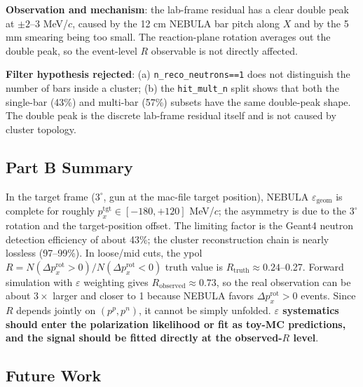 \documentclass[a4paper,11pt]{article}
\begin{document}
\textbf{Observation and mechanism}: the lab-frame residual has a clear double
peak at $\pm 2$--$3$ MeV/$c$, caused by the 12 cm NEBULA bar pitch along $X$
and by the 5 mm smearing being too small. The reaction-plane rotation averages
out the double peak, so the event-level $R$ observable is not directly affected.

\textbf{Filter hypothesis rejected}: (a) \texttt{n\_reco\_neutrons==1} does not
distinguish the number of bars inside a cluster; (b) the \texttt{hit\_mult\_n}
split shows that both the single-bar (43\%) and multi-bar (57\%) subsets have
the same double-peak shape. The double peak is the discrete lab-frame residual
itself and is not caused by cluster topology.

\subsection{Part B Summary}

In the target frame ($3^\circ$, gun at the mac-file target position),
NEBULA $\varepsilon_\mathrm{geom}$ is complete for roughly
$p_x^\mathrm{tgt}\in[-180,+120]$ MeV/$c$; the asymmetry is due to the
$3^\circ$ rotation and the target-position offset. The limiting factor is the
Geant4 neutron detection efficiency of about 43\%; the cluster reconstruction
chain is nearly lossless (97--99\%). In loose/mid cuts, the ypol
$R=N(\Delta p_x^\mathrm{rot}>0)/N(\Delta p_x^\mathrm{rot}<0)$ truth value is
$R_\mathrm{truth}\approx 0.24$--0.27. Forward simulation with $\varepsilon$
weighting gives $R_\mathrm{observed}\approx 0.73$, so the real observation can
be about $3\times$ larger and closer to 1 because NEBULA favors
$\Delta p_x^\mathrm{rot}>0$ events. Since $R$ depends jointly on $(p^p,p^n)$,
it cannot be simply unfolded. \textbf{$\varepsilon$ systematics should enter
the polarization likelihood or fit as toy-MC predictions, and the signal should
be fitted directly at the observed-$R$ level}.

\subsection{Future Work}
\end{document}
